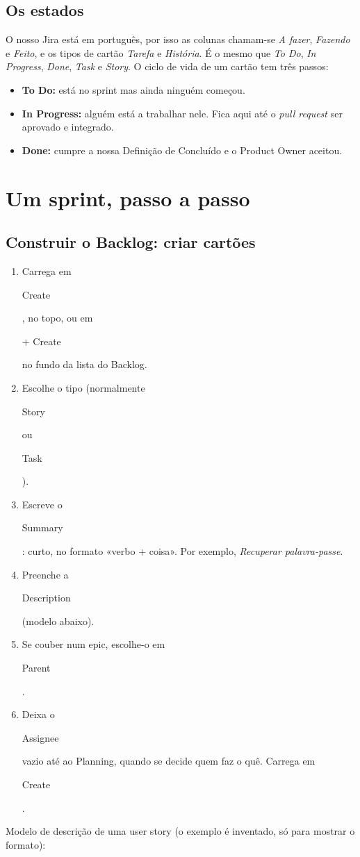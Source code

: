 \documentclass[11pt,a4paper]{article}
\newcommand{\btn}[1]{{\setlength{\fboxsep}{1.6pt}\colorbox{azulclaro}{\sffamily\small\strut #1}}}
\begin{document}
\subsection{Os estados}

O nosso Jira está em português, por isso as colunas chamam-se \textit{A fazer}, \textit{Fazendo} e \textit{Feito}, e os tipos de cartão \textit{Tarefa} e \textit{História}. É o mesmo que \textit{To Do}, \textit{In Progress}, \textit{Done}, \textit{Task} e \textit{Story}. O ciclo de vida de um cartão tem três passos:

\begin{itemize}
  \item \textbf{To Do:} está no sprint mas ainda ninguém começou.
  \item \textbf{In Progress:} alguém está a trabalhar nele. Fica aqui até o \textit{pull request} ser aprovado e integrado.
  \item \textbf{Done:} cumpre a nossa Definição de Concluído e o Product Owner aceitou.
\end{itemize}

\section{Um sprint, passo a passo}

\subsection{Construir o Backlog: criar cartões}

\begin{enumerate}
  \item Carrega em \btn{Create}, no topo, ou em \btn{+ Create} no fundo da lista do Backlog.
  \item Escolhe o tipo (normalmente \btn{Story} ou \btn{Task}).
  \item Escreve o \btn{Summary}: curto, no formato «verbo + coisa». Por exemplo, \textit{Recuperar palavra-passe}.
  \item Preenche a \btn{Description} (modelo abaixo).
  \item Se couber num epic, escolhe-o em \btn{Parent}.
  \item Deixa o \btn{Assignee} vazio até ao Planning, quando se decide quem faz o quê. Carrega em \btn{Create}.
\end{enumerate}

Modelo de descrição de uma user story (o exemplo é inventado, só para mostrar o formato):
\end{document}
